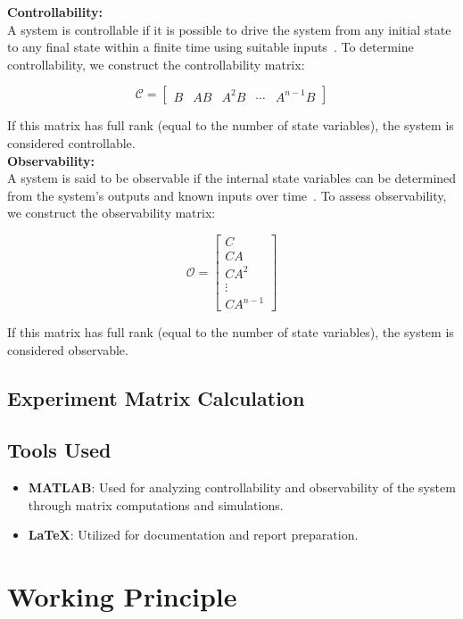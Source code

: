 \documentclass[12pt]{article}
\begin{document}
\textbf{Controllability:} \\
A system is controllable if it is possible to drive the system from any initial state to any final state within a finite time using suitable inputs~\cite{Ogata}. To determine controllability, we construct the controllability matrix:

\[
  \mathcal{C} = \begin{bmatrix} B & AB & A^2B & \cdots & A^{n-1}B \end{bmatrix}
\]

If this matrix has full rank (equal to the number of state variables), the system is considered controllable.\\

\textbf{Observability:} \\
A system is said to be observable if the internal state variables can be determined from the system's outputs and known inputs over time~\cite{Nise}. To assess observability, we construct the observability matrix:

\[
  \mathcal{O} = \begin{bmatrix} C \\ CA \\ CA^2 \\ \vdots \\ CA^{n-1} \end{bmatrix}
\]

If this matrix has full rank (equal to the number of state variables), the system is considered observable.

\subsection*{Experiment Matrix Calculation}


\subsection*{Tools Used}
\begin{itemize}
  \item \textbf{MATLAB}: Used for analyzing controllability and observability of the system through matrix computations and simulations.
  \item \textbf{\LaTeX}: Utilized for documentation and report preparation.
\end{itemize}

\section*{Working Principle}
\end{document}
